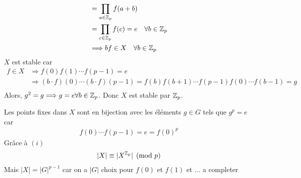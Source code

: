 \documentclass[french,a4paper,10pt]{article}
\begin{document}
\begin{td-sol}
\[\begin{aligned}
			&=\prod_{a\in\mathbb{Z}_p}f(a+b)\\
			&=\prod_{c\in\mathbb{Z}_p}f(c)=e\quad\forall b\in\mathbb{Z}_p\\
			&\Longrightarrow bf\in X\quad\forall b\in\mathbb{Z}_p
		\end{aligned}\]
	$X$ est stable car 
		\[\begin{aligned}
			f\in X&\Longrightarrow f(0)f(1)\cdots f(p-1)=e\\
			&\Longrightarrow(b\cdot f)(0)\cdots(b\cdot f)(p-1)=f(b)f(b+1)\cdots f(p-1)f(0)\cdots f(b-1)=g\\
		\end{aligned}\]
	Alors, $g^2=g\Longrightarrow g=e\forall b\in \mathbb{Z}_p$. Donc $X$ est stable par $\mathbb{Z}_p$.
	
	Les points fixes dans $X$ sont en bijection avec les éléments $g\in G$ tels que $g^p=e$ car
		\[\begin{aligned}
			f(0)\cdots f(p-1)=e=f(0)^p
		\end{aligned}\]
		Grâce à $(i)$
			\[\begin{aligned}
				|X|\equiv |X^{\mathbb{Z}_p}|\pmod p
			\end{aligned}\]
		Mais $|X|=|G|^{p-1}$ car on a $|G|$ choix pour $f(0)$ et $f(1)$ et ... a completer
	\end{td-sol}
\end{document}
